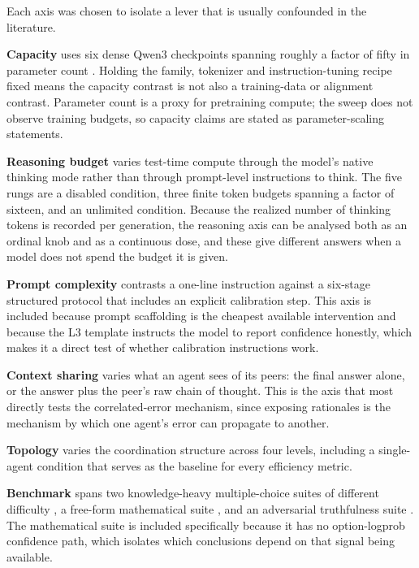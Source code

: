 
Each axis was chosen to isolate a lever that is usually confounded in the literature.

\textbf{Capacity} uses six dense Qwen3 checkpoints spanning roughly a factor of fifty in
parameter count \citep{qwen3}. Holding the family, tokenizer and instruction-tuning
recipe fixed means the capacity contrast is not also a training-data or alignment
contrast. Parameter count is a proxy for pretraining compute; the sweep does not observe
training budgets, so capacity claims are stated as parameter-scaling statements.

\textbf{Reasoning budget} varies test-time compute through the model's native thinking
mode rather than through prompt-level instructions to think. The five rungs are a
disabled condition, three finite token budgets spanning a factor of sixteen, and an
unlimited condition. Because the realized number of thinking tokens is recorded per
generation, the reasoning axis can be analysed both as an ordinal knob and as a
continuous dose, and these give different answers when a model does not spend the budget
it is given.

\textbf{Prompt complexity} contrasts a one-line instruction against a six-stage
structured protocol that includes an explicit calibration step. This axis is included
because prompt scaffolding is the cheapest available intervention and because the L3
template instructs the model to report confidence honestly, which makes it a direct test
of whether calibration instructions work.

\textbf{Context sharing} varies what an agent sees of its peers: the final answer alone,
or the answer plus the peer's raw chain of thought. This is the axis that most directly
tests the correlated-error mechanism, since exposing rationales is the mechanism by which
one agent's error can propagate to another.

\textbf{Topology} varies the coordination structure across four levels, including a
single-agent condition that serves as the baseline for every efficiency metric.

\textbf{Benchmark} spans two knowledge-heavy multiple-choice suites of different
difficulty \citep{rein2024gpqa,wang2024mmlupro}, a free-form mathematical suite
\citep{hendrycks2021math,lightman2024verify}, and an adversarial truthfulness suite
\citep{lin2022truthfulqa}. The mathematical suite is included specifically because it has
no option-logprob confidence path, which isolates which conclusions depend on that signal
being available.

